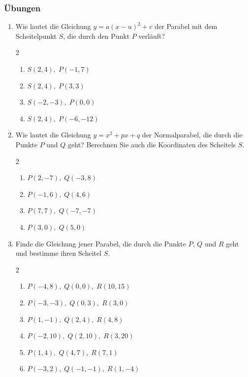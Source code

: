\subsubsection{Übungen}
\begin{enumerate}
    \item Wie lautet die Gleichung \(y=a(x-u)^2+v\) der Parabel mit dem Scheitelpunkt \(S\), die durch den Punkt \(P\) verläuft?
          \begin{multicols}{2}
              \begin{enumerate}[label=\alph*)]
                  \item \(S(2,4),\; P(-1,7)\)
                  \item \(S(2,4),\; P(3,3)\)
                  \item \(S(-2,-3),\; P(0,0)\)
                  \item \(S(2,4),\; P(-6,-12)\)
              \end{enumerate}
          \end{multicols}
    \item Wie lautet die Gleichung \(y=x^2+px+q\) der Normalparabel, die durch die Punkte \(P\) und \(Q\) geht? Berechnen Sie auch die Koordinaten des Scheitels \(S\).
          \begin{multicols}{2}
              \begin{enumerate}[label=\alph*)]
                  \item \(P(2,-7),\; Q(-3,8)\)
                  \item \(P(-1,6),\; Q(4,6)\)
                  \item \(P(7,7),\; Q(-7,-7)\)
                  \item \(P(3,0),\; Q(5,0)\)
              \end{enumerate}
          \end{multicols}
    \item Finde die Gleichung jener Parabel, die durch die Punkte \(P\), \(Q\) und \(R\) geht und bestimme ihren Scheitel \(S\).
          \begin{multicols}{2}
              \begin{enumerate}[label=\alph*)]
                  \item \(P(-4,8),\; Q(0,0),\; R(10,15)\)
                  \item \(P(-3,-3),\; Q(0,3),\; R(3,0)\)
                  \item \(P(1,-1),\; Q(2,4),\; R(4,8)\)
                  \item \(P(-2,10),\; Q(2,10),\; R(3,20)\)
                  \item \(P(1,4),\; Q(4,7),\; R(7,1)\)
                  \item \(P(-3,2),\; Q(-1,-1),\; R(1,-4)\)
              \end{enumerate}
          \end{multicols}
\end{enumerate}
\newpage
